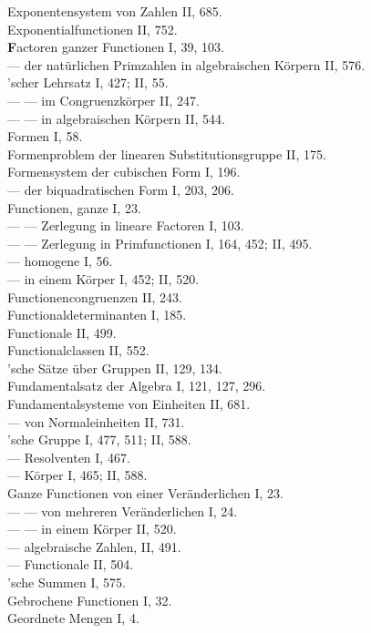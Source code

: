 \noindent
Exponentensystem von Zahlen II, 685.\\
Exponentialfunctionen II, 752.\\

\medskip
\noindent
\textbf{F}actoren ganzer Functionen I, 39, 103.\\
--- der nat\"urlichen Primzahlen in algebraischen K\"orpern II, 576.\\
'scher Lehrsatz I, 427; II, 55.\\
--- --- im Congruenzk\"orper II, 247.\\
--- --- in algebraischen K\"orpern II, 544.\\
Formen I, 58.\\
Formenproblem der linearen Substitutionsgruppe II, 175.\\
Formensystem der cubischen Form I, 196.\\
--- der biquadratischen Form I, 203, 206.\\
Functionen, ganze I, 23.\\
--- --- Zerlegung in lineare Factoren I, 103.\\
--- --- Zerlegung in Primfunctionen I, 164, 452; II, 495.\\
--- homogene I, 56.\\
--- in einem K\"orper I, 452; II, 520.\\
Functionencongruenzen II, 243.\\
Functionaldeterminanten I, 185.\\
Functionale II, 499.\\
Functionalclassen II, 552.\\
'sche S\"atze \"uber Gruppen II, 129, 134.\\
Fundamentalsatz der Algebra I, 121, 127, 296.\\
Fundamentalsysteme von Einheiten II, 681.\\
--- von Normaleinheiten II, 731.\\

\medskip
\noindent
{}'sche Gruppe I, 477, 511; II, 588.\\
--- Resolventen I, 467.\\
--- K\"orper I, 465; II, 588.\\
Ganze Functionen von einer Ver\"anderlichen I, 23.\\
--- --- von mehreren Ver\"anderlichen I, 24.\\
--- --- in einem K\"orper II, 520.\\
--- algebraische Zahlen, II, 491.\\ %
--- Functionale II, 504.\\
'sche Summen I, 575.\\
Gebrochene Functionen I, 32.\\
Geordnete Mengen I, 4.\\


